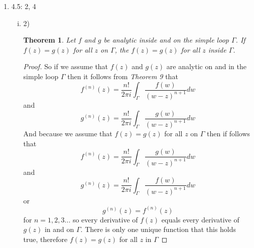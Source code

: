 \documentclass[11pt]{article}
\begin{document}
\begin{enumerate}
\begin{enumerate}[(i)]
\item 20)\\
First we can say that
$$\int_{\Gamma} \frac{1}{z^4-1}dz=0$$
because we see (by looking at figure 4.50) that $\Gamma$ includes all the zeros of the polynomial $P=z^4-1$. So by \emph{Deformation Invariance Theorem} we can deform $\Gamma$ into a circle that has all the zeros of $P$. And if we expand the radius of the circle to infinity we see that the upper bound of the integral becomes zero.

Now if we use partial fractions we can say
\begin{align*}
\int_{\Gamma} \frac{1}{z^4-1}dz &= \int_{\Gamma} \frac{1}{(z-1)(z+1)(z-i)(z+i)}dz\\
&= \int_{\Gamma} \frac{A}{(z-1)}+\frac{B}{(z+1)}+\frac{C}{(z-i)}+\frac{D}{(z+i)}dz
\end{align*}
We can see that $A=C=1$ and $B=D=-1$ so the integral becomes
$$\int_{\Gamma} \frac{1}{(z-1)}-\frac{1}{(z+1)}+\frac{1}{(z-i)}-\frac{1}{(z+i)}dz$$
Now each of for each fraction we can deform the contour so we integrate over a circle around each point to give us $2\pi i$ so we have
\begin{align*}
\int_{\Gamma} \frac{1}{(z-1)}-\frac{1}{(z+1)}+\frac{1}{(z-i)}-\frac{1}{(z+i)}dz &= 2\pi i - 2\pi i+2\pi i -2\pi i\\
&= 0
\end{align*}


\end{enumerate}

\item 4.5:  2, 4 
\begin{enumerate}[(i)]
\item 2)\\
\newtheorem{Theo2}{Theorem}
\begin{Theo2}
Let $f$ and $g$ be analytic inside and on the simple loop $\Gamma$. If $f(z) = g(z)$ for all $z$ on $\Gamma$, the $f(z) = g(z)$ for all $z$ inside $\Gamma$.
\end{Theo2}
\begin{proof}
So if we assume that $f(z)$ and $g(z)$ are analytic on and in the simple loop $\Gamma$ then it follows from \emph{Theorem 9} that
$$f^{(n)}(z) = \frac{n!}{2\pi i}\int_{\Gamma}\frac{f(w)}{(w-z)^{n+1}}dw$$
and
$$g^{(n)}(z) = \frac{n!}{2\pi i}\int_{\Gamma}\frac{g(w)}{(w-z)^{n+1}}dw$$
And because we assume that $f(z) = g(z)$ for all $z$ on $\Gamma$ then if follows that
$$f^{(n)}(z) = \frac{n!}{2\pi i}\int_{\Gamma}\frac{g(w)}{(w-z)^{n+1}}dw$$
and
$$g^{(n)}(z) = \frac{n!}{2\pi i}\int_{\Gamma}\frac{f(w)}{(w-z)^{n+1}}dw$$
or
$$g^{(n)}(z) = f^{(n)}(z)$$
for $n=1,2,3...$ so every derivative of $f(z)$ equals every derivative of $g(z)$ in and on $\Gamma$. There is only one unique function that this holds true, therefore $f(z)=g(z)$ for all $z$ in $\Gamma$
\end{proof}


\end{enumerate}
\end{enumerate}
\end{document}
